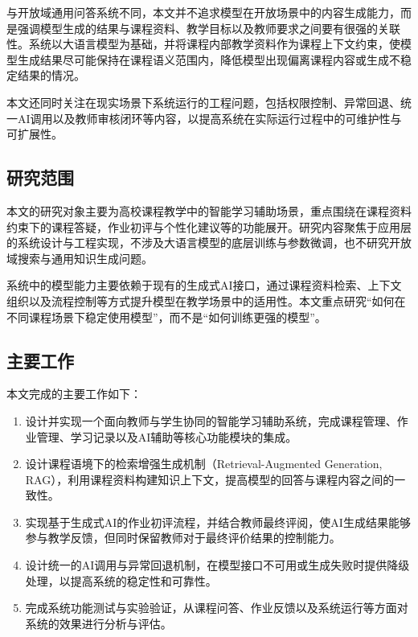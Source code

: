 \documentclass[12pt,a4paper,oneside]{ctexbook}
\numberwithin{equation}{chapter}
\begin{document}
与开放域通用问答系统不同，本文并不追求模型在开放场景中的内容生成能力，而是强调模型生成的结果与课程资料、教学目标以及教师要求之间要有很强的关联性。系统以大语言模型为基础，并将课程内部教学资料作为课程上下文约束，使模型生成结果尽可能保持在课程语义范围内，降低模型出现偏离课程内容或生成不稳定结果的情况。

本文还同时关注在现实场景下系统运行的工程问题，包括权限控制、异常回退、统一AI调用以及教师审核闭环等内容，以提高系统在实际运行过程中的可维护性与可扩展性。

\subsection{研究范围}
本文的研究对象主要为高校课程教学中的智能学习辅助场景，重点围绕在课程资料约束下的课程答疑，作业初评与个性化建议等的功能展开。研究内容聚焦于应用层的系统设计与工程实现，不涉及大语言模型的底层训练与参数微调，也不研究开放域搜索与通用知识生成问题。

系统中的模型能力主要依赖于现有的生成式AI接口，通过课程资料检索、上下文组织以及流程控制等方式提升模型在教学场景中的适用性。本文重点研究“如何在不同课程场景下稳定使用模型”，而不是“如何训练更强的模型”。

\subsection{主要工作}
本文完成的主要工作如下：

\begin{enumerate}
    \item 设计并实现一个面向教师与学生协同的智能学习辅助系统，完成课程管理、作业管理、学习记录以及AI辅助等核心功能模块的集成。

    \item 设计课程语境下的检索增强生成机制（Retrieval-Augmented Generation, RAG），利用课程资料构建知识上下文，提高模型的回答与课程内容之间的一致性。

    \item 实现基于生成式AI的作业初评流程，并结合教师最终评阅，使AI生成结果能够参与教学反馈，但同时保留教师对于最终评价结果的控制能力。

    \item 设计统一的AI调用与异常回退机制，在模型接口不可用或生成失败时提供降级处理，以提高系统的稳定性和可靠性。

    \item 完成系统功能测试与实验验证，从课程问答、作业反馈以及系统运行等方面对系统的效果进行分析与评估。
\end{enumerate}
\end{document}
